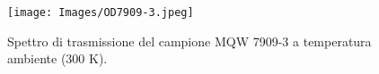 \begin{figure}[h!]
    \centering
    \texttt{[image: Images/OD7909-3.jpeg]}
    \caption{Spettro di trasmissione del campione MQW 7909-3 a temperatura ambiente (300 K).}
    \label{fig:my_label}
\end{figure}